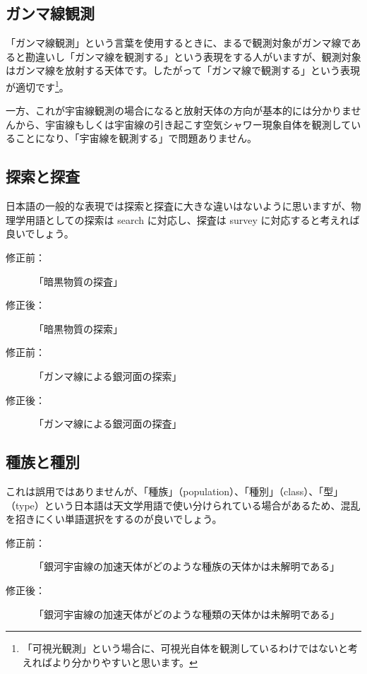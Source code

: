\subsection{ガンマ線観測}

「ガンマ線観測」という言葉を使用するときに、まるで観測対象がガンマ線であると勘違いし「ガンマ線を観測する」という表現をする人がいますが、観測対象はガンマ線を放射する天体です。したがって「ガンマ線で観測する」という表現が適切です\footnote{「可視光観測」という場合に、可視光自体を観測しているわけではないと考えればより分かりやすいと思います。}。

一方、これが宇宙線観測の場合になると放射天体の方向が基本的には分かりませんから、宇宙線もしくは宇宙線の引き起こす空気シャワー現象自体を観測していることになり、「宇宙線を観測する」で問題ありません。

\subsection{探索と探査}

日本語の一般的な表現では探索と探査に大きな違いはないように思いますが、物理学用語としての探索は search に対応し、探査は survey に対応すると考えれば良いでしょう。

\begin{description}
\item[修正前：]「暗黒物質の探査」
\item[修正後：]「暗黒物質の探索」
\end{description}

\begin{description}
\item[修正前：]「ガンマ線による銀河面の探索」
\item[修正後：]「ガンマ線による銀河面の探査」
\end{description}

\subsection{種族と種別}

これは誤用ではありませんが、「種族」（population）、「種別」（class）、「型」（type）という日本語は天文学用語で使い分けられている場合があるため、混乱を招きにくい単語選択をするのが良いでしょう。

\begin{description}
\item[修正前：]「銀河宇宙線の加速天体がどのような種族の天体かは未解明である」
\item[修正後：]「銀河宇宙線の加速天体がどのような種類の天体かは未解明である」
\end{description}



